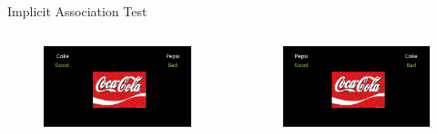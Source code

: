 \documentclass[compress]{beamer}
\begin{document}
\begin{frame}{Implicit Association Test}
\begin{columns}
\end{columns}




\end{frame}


\begin{frame}
	\begin{columns}
		\centering{\textcolor{unipd}{Coke-Good/Pepsi-Bad (CGPB)}}
		\begin{figure}
			\includegraphics[width=\linewidth]{cocagood.png}
		\end{figure}
		
		\centering{\textcolor{blu}{Pepsi-Good/Coke-Bad (PGCB)}}
		\begin{figure}
			\includegraphics[width=\linewidth]{cocabad.png}
		\end{figure}
	\end{columns}

\end{frame}
\end{document}
